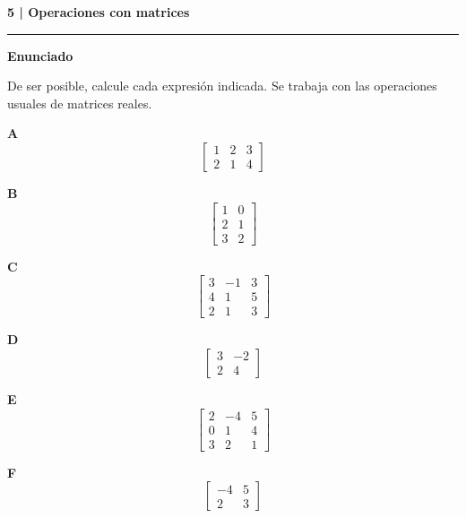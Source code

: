 \documentclass[11pt,a4paper,landscape]{article}
\newcommand{\titulo}[1]{{\LARGE\bfseries #1}\par\smallskip\hrule\medskip}
\begin{document}
\newpage{}\hypertarget{1.2-5}{}
\titulo{5 | Operaciones con matrices}
\textbf{Enunciado}\par De ser posible, calcule cada expresión indicada. Se trabaja con las operaciones usuales de matrices reales.
\par\smallskip \begin{minipage}[t]{.47\linewidth}\centering \textbf{A}\[\begin{bmatrix}1 & 2 & 3\\2 & 1 & 4\end{bmatrix}\]\end{minipage}\hfill\begin{minipage}[t]{.47\linewidth}\centering \textbf{B}\[\begin{bmatrix}1 & 0\\2 & 1\\3 & 2\end{bmatrix}\]\end{minipage}\par\smallskip
\par\smallskip \begin{minipage}[t]{.47\linewidth}\centering \textbf{C}\[\begin{bmatrix}3 & -1 & 3\\4 & 1 & 5\\2 & 1 & 3\end{bmatrix}\]\end{minipage}\hfill\begin{minipage}[t]{.47\linewidth}\centering \textbf{D}\[\begin{bmatrix}3 & -2\\2 & 4\end{bmatrix}\]\end{minipage}\par\smallskip
\par\smallskip \begin{minipage}[t]{.47\linewidth}\centering \textbf{E}\[\begin{bmatrix}2 & -4 & 5\\0 & 1 & 4\\3 & 2 & 1\end{bmatrix}\]\end{minipage}\hfill\begin{minipage}[t]{.47\linewidth}\centering \textbf{F}\[\begin{bmatrix}-4 & 5\\2 & 3\end{bmatrix}\]\end{minipage}\par\smallskip
\end{document}
